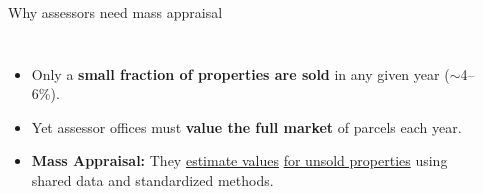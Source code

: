 \documentclass[aspectratio=169,12pt,]{beamer}
\newcommand{\1}{\mathbf{1}}
\begin{document}
\begin{frame}{Why assessors need mass appraisal}


\begin{columns}[T,onlytextwidth]





\medskip


\begin{itemize}
    \item Only a \textbf{small fraction of properties are sold} in any given year ($\sim$4--6\%).
    \medskip
    \item Yet assessor offices must \textbf{value the full market} of parcels each year.
    \medskip
    \item \textbf{Mass Appraisal:} They \underline{estimate values} \underline{for unsold properties} using shared data and standardized methods.
\end{itemize}

\vspace{4mm}
{\scriptsize
}



\vspace{3mm}
\centering
{}


\end{columns}

\end{frame}
\end{document}
